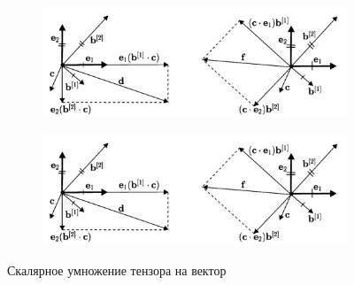 \begin{figure}[H]
	\hfill
	\begin{subfigure}{0.48\textwidth}
		\centering
		\includegraphics[width=0.7\linewidth,trim={0 0 12cm 0},clip]{img/que3_2}
		\label{fig:que32_ten_vec}
	\end{subfigure}
	\hfill
	\begin{subfigure}{0.48\textwidth}
		\centering
		\includegraphics[width=0.7\linewidth,trim={11cm 0 0cm 0},clip]{img/que3_2}
		\label{fig:que32_vec_ten}
	\end{subfigure}
	\hfill
	\caption{Скалярное умножение тензора на вектор}
	\label{fig:que32}
\end{figure}

